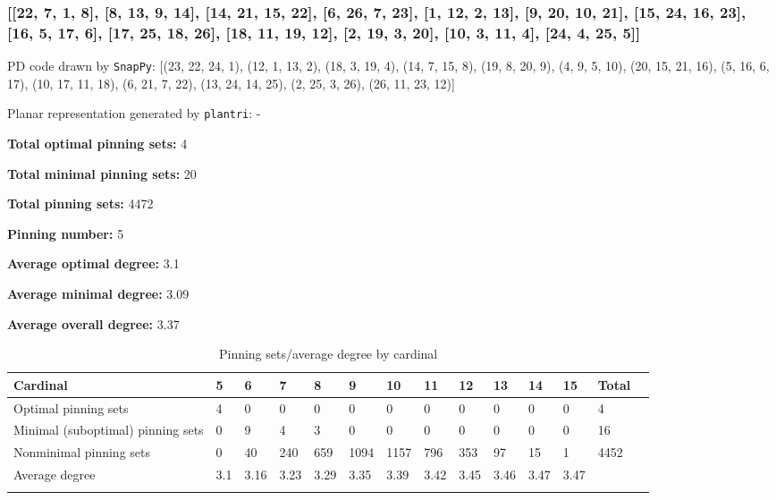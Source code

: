 \documentclass{article}%
\begin{document}
\newpage

\subsubsection{[[22, 7, 1, 8], [8, 13, 9, 14], [14, 21, 15, 22], [6, 26, 7, 23], [1, 12, 2, 13], [9, 20, 10, 21], [15, 24, 16, 23], [16, 5, 17, 6], [17, 25, 18, 26], [18, 11, 19, 12], [2, 19, 3, 20], [10, 3, 11, 4], [24, 4, 25, 5]]}

{\small\noindent PD code drawn by \texttt{SnapPy}: [(23, 22, 24, 1), (12, 1, 13, 2), (18, 3, 19, 4), (14, 7, 15, 8), (19, 8, 20, 9), (4, 9, 5, 10), (20, 15, 21, 16), (5, 16, 6, 17), (10, 17, 11, 18), (6, 21, 7, 22), (13, 24, 14, 25), (2, 25, 3, 26), (26, 11, 23, 12)]}

{\small\noindent Planar representation generated by \texttt{plantri}: -}

\begin{multicols}{2}
{\normalsize \noindent\textbf{Total optimal pinning sets:} 4

\noindent\textbf{Total minimal pinning sets:} 20

\noindent\textbf{Total pinning sets:} 4472

\noindent\textbf{Pinning number:} 5

}
\columnbreak

{\normalsize \noindent\textbf{Average optimal degree:} 3.1

\noindent\textbf{Average minimal degree:} 3.09

\noindent\textbf{Average overall degree:} 3.37

}
\end{multicols}

\begin{table}[ht]
	\caption{Pinning sets/average degree by cardinal}
	\centering
	\renewcommand{\arraystretch}{1.5}
	\begin{tabularx}{\textwidth}{lXXXXXXXXXXXXX}
		\toprule
			Cardinal & 5 & 6 & 7 & 8 & 9 & 10 & 11 & 12 & 13 & 14 & 15 & Total\\
			\hline
			Optimal pinning sets & 4 & 0 & 0 & 0 & 0 & 0 & 0 & 0 & 0 & 0 & 0 & 4 \\
			Minimal (suboptimal) pinning sets & 0 & 9 & 4 & 3 & 0 & 0 & 0 & 0 & 0 & 0 & 0 & 16 \\
			Nonminimal pinning sets & 0 & 40 & 240 & 659 & 1094 & 1157 & 796 & 353 & 97 & 15 & 1 & 4452 \\
			Average degree & 3.1 & 3.16 & 3.23 & 3.29 & 3.35 & 3.39 & 3.42 & 3.45 & 3.46 & 3.47 & 3.47 &  \\
		\bottomrule \\ 
	\end{tabularx}
\end{table}
\end{document}
